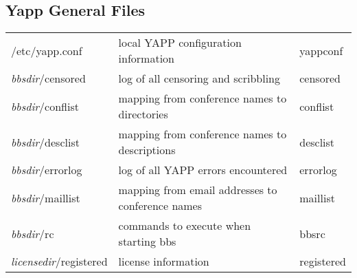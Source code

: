 \documentclass[twoside]{report}
\begin{document}
      \subsection{Yapp General Files}

         \tablelasttail{\hline}
         \begin{supertabular}{lp{7cm}l}
            /etc/yapp.conf  
                            & local YAPP configuration information               
                            & yappconf \\
            {\em bbsdir}/censored    
                            & log of all censoring and scribbling                
                            & censored \\
            {\em bbsdir}/conflist    
                            & mapping from conference names to directories       
                            & conflist \\
            {\em bbsdir}/desclist    
                            & mapping from conference names to descriptions     
                            & desclist \\
            {\em bbsdir}/errorlog    
                            & log of all YAPP errors encountered                 
                            & errorlog \\
            {\em bbsdir}/maillist    
                            & mapping from email addresses to conference names   
                            & maillist \\
            {\em bbsdir}/rc          
                            & commands to execute when starting bbs              
                            & bbsrc \\
            {\em licensedir}/registered  
                            & license information                                
                            & registered \\
                  
         \end{supertabular}
\end{document}

